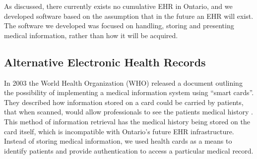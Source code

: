 As discussed, there currently exists no cumulative EHR in Ontario, and we developed software based on the assumption that in the future an EHR will exist. The software we developed was focused on handling, storing and presenting medical information, rather than how it will be acquired.

\subsection{Alternative Electronic Health Records}

In 2003 the World Health Organization (WHO) released a document outlining the possibility of implementing a medical information system using “smart cards”. They described how information stored on a card could be carried by patients, that when scanned, would allow professionals to see the patients medical history \cite{smartcard1}. This method of information retrieval has the medical history being stored on the card itself, which is incompatible with Ontario's future EHR infrastructure. Instead of storing medical information, we used health cards as a means to identify patients and provide authentication to access a particular medical record.

